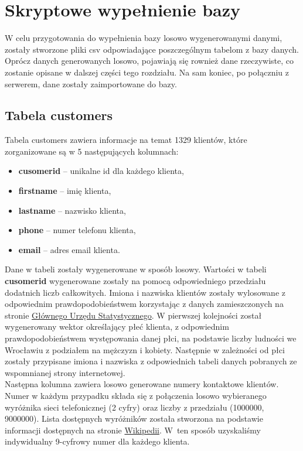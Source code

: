 \documentclass{article}
\begin{document}
	\section{Skryptowe wypełnienie bazy}
	
	W celu przygotowania do wypełnienia bazy losowo wygenerowanymi danymi, zostały stworzone pliki csv odpowiadające poszczególnym tabelom z bazy danych. Oprócz danych generowanych losowo, pojawiają się rownież dane rzeczywiste, co zostanie opisane w dalszej części tego rozdziału. Na sam koniec, po połączniu z serwerem, dane zostały zaimportowane do bazy.
	
	\subsection{Tabela customers}
		Tabela customers zawiera informacje na temat 1329 klientów, które zorganizowane są w  5 następujących kolumnach:
		\begin{itemize}
			\setlength{\itemsep}{-2pt}
			\item \textbf{cusomer\textunderscore id} – unikalne id dla każdego klienta,
			\item \textbf{first\textunderscore name} – imię klienta,
			\item \textbf{last\textunderscore name} – nazwisko klienta,
			\item \textbf{phone} – numer telefonu klienta,
			\item \textbf{email} – adres email klienta.
		\end{itemize}
		
		Dane w tabeli zostały wygenerowane w sposób losowy. Wartości w tabeli \textbf{cusomer\textunderscore id} wygenerowane zostały na pomocą odpowiedniego przedziału  dodatnich liczb całkowitych. Imiona i nazwiska klientów zostały wylosowane z odpowiednim prawdopodobieństwem korzystając z danych zamieszczonych na stronie \href{https://stat.gov.pl/}{Głównego Urzędu Statystycznego}. W pierwszej kolejności został wygenerowany wektor określający płeć klienta, z odpowiednim prawdopodobieństwem występowania danej płci, na podstawie liczby ludności we Wrocławiu z podziałem na mężczyzn i kobiety. Następnie w zależności od płci zostały przypisane imiona i nazwiska z odpowiednich tabeli danych pobranych ze wspomnianej strony internetowej.\\
		
		Następna kolumna zawiera losowo generowane numery kontaktowe klientów. Numer w każdym przypadku składa się z połączenia losowo wybieranego wyróżnika sieci telefonicznej (2 cyfry) oraz liczby z przedziału (1000000, 9000000). Lista dostępnych wyróżników została stworzona na podstawie informacji dostępnych na stronie \href{https://pl.wikipedia.org/wiki/Numery_telefoniczne_w_Polsce}{Wikipedii}. W~ten sposób uzyskaliśmy indywidualny 9-cyfrowy numer dla każdego klienta.\\
		
\end{document}

